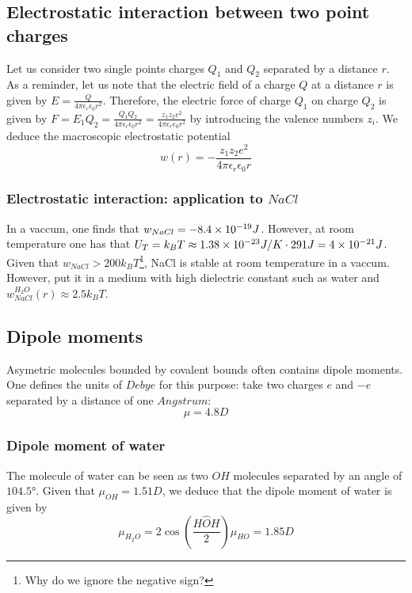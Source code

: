 \documentclass[../phys-f308.tex]{subfiles}
\begin{document}
    \subsection{Electrostatic interaction between two point charges}
    Let us consider two single points charges $Q_1$ and $Q_2$ separated by a distance $r$. As a reminder, let us note that the electric field of a charge $Q$ at a distance $r$ is given by $E = \frac{Q}{4\pi\epsilon_r\epsilon_0 r^2}$. Therefore, the electric force of charge $Q_1$ on charge $Q_2$ is given by $F=E_1Q_2 = \frac{Q_1Q_2}{4\pi\epsilon_r\epsilon_0 r^2} = \frac{z_1z_2 e^2}{4\pi\epsilon_r\epsilon_0 r^2}$ by introducing the valence numbers $z_i$. We deduce the macroscopic electrostatic potential
    \begin{equation}
        w(r) = -\frac{z_1z_2e^2}{4\pi\epsilon_r\epsilon_0 r}
    \end{equation} 

    \subsubsection{Electrostatic interaction: application to $NaCl$}

    In a vaccum, one finds that $w_{NaCl} = -8.4\times 10^{-19}J$. However, at room temperature one has that $U_T = k_BT \approx 1.38\times 10^{-23} J/K \cdot 291 J = 4\times 10^{-21}J$. Given that \color{red}$w_{NaCl}>200 k_BT$\footnote{Why do we ignore the negative sign?}\color{black}, NaCl is stable at room temperature in a vaccum. However, put it in a medium with high dielectric constant such as water and $w_{NaCl}^{H_2O}(r) \approx 2.5 k_BT$.

    \subsection{Dipole moments}

    Asymetric molecules bounded by covalent bounds often contains dipole moments. One defines the units of $Debye$ for this purpose: take two charges $e$ and $-e$ separated by a distance of one $Angstrum$:
    \begin{equation*}
        \mu = 4.8 D
    \end{equation*}

    \subsubsection{Dipole moment of water}

    \begin{example}
        The molecule of water can be seen as two $OH$ molecules separated by an angle of $104.5°$. Given that $\mu_{OH} = 1.51 D$, we deduce that the dipole moment of water is given by 
        \begin{equation}
            \mu_{H_2O} = 2\cos\left(\frac{H\hat{O}H}{2}\right)\mu_{HO} = 1.85D
        \end{equation}
    \end{example}
\end{document}
